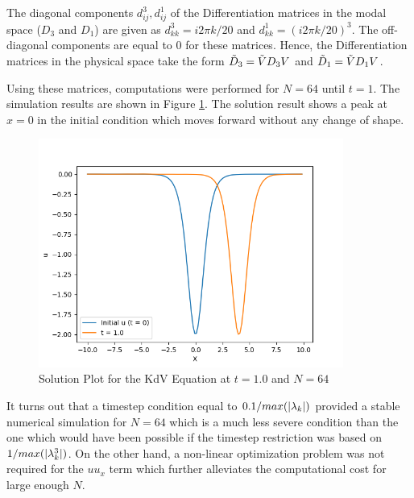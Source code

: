 \documentclass[12pt,dvipsnames]{article}
\DeclarePairedDelimiter\abs{\lvert}{\rvert}
\begin{document}
The diagonal components $d^3_{ij}, d^1_{ij}$ of the Differentiation matrices in the modal space ($D_3$ and $D_1$) are given as $d^3_{kk} = i 2 \pi k /20$ and $d^1_{kk} = (i 2 \pi k /20)^3$. The off-diagonal components are equal to $0$ for these matrices. Hence, the Differentiation matrices in the physical space take the form $\Tilde{D}_3 = \Tilde{V} D_3 V$ and $\Tilde{D}_1 = \Tilde{V} D_1 V$.

Using these matrices, computations were performed for $N = 64$ until $t = 1$. The simulation results are shown in Figure \ref{fig:Q2_N=64,t=1}. The solution result shows a peak at $x = 0$ in the initial condition which moves forward without any change of shape. 
\begin{figure}
    \centering
    \includegraphics[width = 10cm]{solutionPlot_N=64t = 1.0.png}
    \caption{Solution Plot for the KdV Equation at $t = 1.0$ and $N = 64$}
    \label{fig:Q2_N=64,t=1}
\end{figure}
It turns out that a timestep condition equal to $0.1/max(\abs{\lambda_k})$ provided a stable numerical simulation for $N = 64$ which is a much less severe condition than the one which would have been possible if the timestep restriction was based on $1/max(\abs{\lambda_k^3})$. On the other hand, a non-linear optimization problem was not required for the $uu_x$ term which further alleviates the computational cost for large enough $N$.
\end{document}
